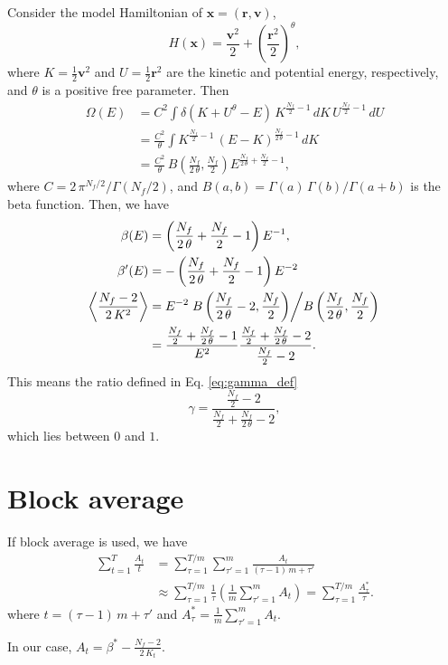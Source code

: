 \documentclass[reprint]{revtex4-1}
\begin{document}
Consider the model Hamiltonian of $\mathbf x = (\mathbf r, \mathbf v)$,
\begin{equation}
  H(\mathbf x)
  =
  \frac{\mathbf v^2} { 2 }
  +
  \left( \frac{\mathbf r^2} { 2 } \right)^\theta
  ,
\end{equation}
%
where $K = \frac 1 2 {\mathbf v}^2$ and
$U = \frac 1 2 {\mathbf r}^2$
are the kinetic and potential energy, respectively,
and $\theta$ is a positive free parameter.
Then
\begin{align*}
  \Omega(E)
  &=
  C^2
  \int
    \delta\left( K + U^\theta - E \right) \,
    K^{\frac{ N_f } 2 - 1} \, dK \, U^{\frac{ N_f } 2 - 1} \, dU
  \\
  &=
  \frac{ C^2 } { \theta }
  \int
  K^{\frac{ N_f } 2 - 1} \, (E - K)^{\frac{ N_f }{ 2 \, \theta } - 1}
    \, dK
  \\
  &=
  \frac{ C^2 }{ \theta } \,
  B\left( \frac{ N_f } {2 \, \theta}, \frac{ N_f } 2 \right)
  E^{ \frac{ N_f }{2 \, \theta} + \frac{N_f}{2} - 1 }
  ,
\end{align*}
where
%
$C = 2 \, \pi^{N_f/2} / \Gamma\left( N_f / 2 \right)$,
and
$B(a, b) = \Gamma(a) \, \Gamma(b) / \Gamma(a+b)$
is the beta function.
%
Then, we have
\begin{align*}
\beta(E)
&=
\left(
  \frac{ N_f } { 2 \, \theta } + \frac{ N_f } 2 - 1
\right)
E^{-1}
,
\\
\beta'(E)
&=
-
\left(
  \frac{ N_f } { 2 \, \theta } + \frac{ N_f } 2 - 1
\right)
E^{-2}
\\
\left\langle
  \frac{
    N_f - 2
  }
  {
    2 \, K^2
  }
\right\rangle
&=
  E^{-2}
\left.
  B\left( \frac{ N_f } { 2  \, \theta } - 2, \frac{ N_f } { 2 } \right)
\middle/
  B\left( \frac{ N_f } { 2  \, \theta }, \frac{ N_f } { 2 } \right)
\right.
\\
&=
\frac{ \frac{ N_f } 2 + \frac{ N_f }{2 \, \theta} - 1 }
     { E^2 }
\frac{ \frac{ N_f } 2 + \frac{ N_f }{2 \, \theta} - 2 }
     { \frac{ N_f } 2 - 2 }
.
\end{align*}
This means the ratio defined in Eq. \eqref{eq:gamma_def}
$$
\gamma
=
\frac
{
  \frac{ N_f } 2 - 2
}
{
  \frac{ N_f } 2 + \frac{N_f}{2 \, \theta} - 2
}
,
$$
which lies between $0$ and $1$.



\section{\label{sec:block}
Block average}



If block average is used, we have
%
\begin{align*}
  \sum_{t = 1}^T \frac{ A_t } { t }
  &=
  \sum_{\tau = 1}^{T/m}
  \sum_{\tau' = 1}^{m}
  \frac{ A_t } { (\tau - 1) \, m + \tau' }
  \\
  &\approx
  \sum_{\tau = 1}^{T/m}
  \frac{ 1 } { \tau }
  \left(
    \frac 1 m
    \sum_{\tau' = 1}^m
    A_t
  \right)
  =
  \sum_{\tau = 1}^{T/m}
  \frac{ A^*_\tau } { \tau }
  .
\end{align*}
%
where
$t = (\tau - 1) \, m + \tau'$
and
$
A^*_\tau = \frac 1 m
\sum_{\tau' = 1}^m A_t.
$

In our case,
$
A_t = \beta^* - \frac{ N_f - 2 } { 2 \, K_t }.
$


%

\end{document}
